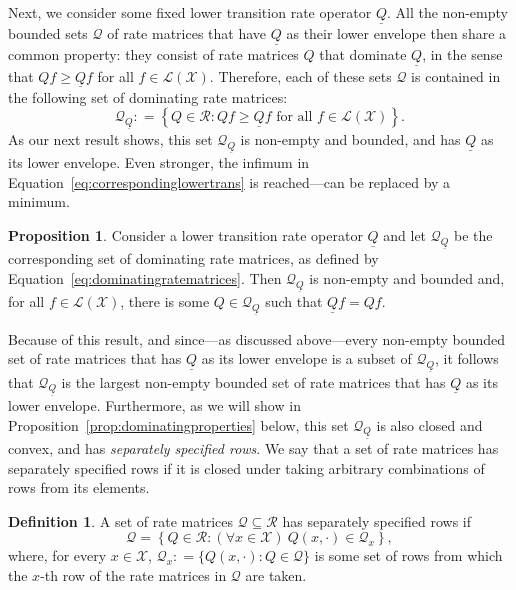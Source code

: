 \documentclass[10pt]{paper}
\theoremstyle{definition}
\newtheorem{proposition}[theorem]{Proposition}
\newtheorem{definition}{Definition}
\newcommand{\states}{\mathcal{X}}
\newcommand{\gambles}{\mathcal{L}}
\newcommand{\gamblesX}{\gambles(\states)}
\newcommand{\rateset}{\mathcal{Q}}
\newcommand{\lrate}{\underline{Q}}
\newcommand{\coloneqq}{:\!=}
\begin{document}
Next, we consider some fixed lower transition rate operator $\lrate$.
All the non-empty bounded sets $\rateset$ of rate matrices that have $\lrate$ as their lower envelope then share a common property: they consist of rate matrices $Q$ that dominate $\lrate$, in the sense that $Qf\geq\lrate f$ for all $f\in\gamblesX$. Therefore, each of these sets $\rateset$ is contained in the following set of dominating rate matrices:
\begin{equation}\label{eq:dominatingratematrices}
\rateset_{\lrate}\coloneqq
\left\{
Q\in\mathcal{R}
\colon
Qf\geq\lrate f\text{ for all $f\in\gamblesX$}
\right\}.
\end{equation}
As our next result shows, this set $\rateset_{\lrate}$ is non-empty and bounded, and has $\lrate$ as its lower envelope. Even stronger, the infimum in Equation~\eqref{eq:correspondinglowertrans} is reached---can be replaced by a minimum.

\begin{proposition}\label{prop:dominating_nonempty_bounded}
Consider a lower transition rate operator $\lrate$ and let $\rateset_{\lrate}$ be the corresponding set of dominating rate matrices, as defined by Equation~\eqref{eq:dominatingratematrices}. Then $\rateset_{\lrate}$ is non-empty and bounded and, for all $f\in\gamblesX$, there is some $Q\in\rateset_{\lrate}$ such that $\lrate f=Qf$.
\end{proposition}

\noindent
Because of this result, and since---as discussed above---every non-empty bounded set of rate matrices that has $\lrate$ as its lower envelope is a subset of $\rateset_{\lrate}$, it follows that $\rateset_{\lrate}$ is the largest non-empty bounded set of rate matrices that has $\lrate$ as its lower envelope.
Furthermore, as we will show in Proposition~\ref{prop:dominatingproperties} below, this set $\rateset_{\lrate}$ is also closed and convex, and has \emph{separately specified rows}. We say that a set of rate matrices has separately specified rows if it is closed under taking arbitrary combinations of rows from its elements.

\begin{definition}
A set of rate matrices $\rateset\subseteq\mathcal{R}$ has separately specified rows if
\begin{equation*}
\rateset=\left\{
Q\in\mathcal{R}
\colon
(\forall x\in\states)~Q(x,\cdot)\in\rateset_x\right\},
\end{equation*}
where, for every $x\in\states$, $\rateset_x\coloneqq\{Q(x,\cdot)\colon Q\in\rateset\}$ is some set of rows from which the $x$-th row of the rate matrices in $\rateset$ are taken.
\end{definition}
\end{document}
